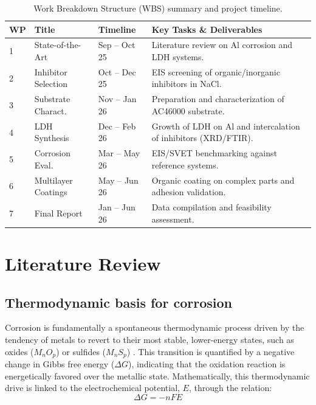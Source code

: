 \documentclass[11pt,twoside,a4paper]{report}
\begin{document}
\begin{table}[htbp]
    \centering
    \small
    \renewcommand{\arraystretch}{1.5} %
    \caption{Work Breakdown Structure (WBS) summary and project timeline.}
    \label{tab:wbs_summary}
    \begin{tabular}{lll>{\raggedright\arraybackslash}p{5cm}}
        \toprule
        WP & Title & Timeline & Key Tasks \& Deliverables \\
        \midrule
        1 & State-of-the-Art & Sep -- Oct 25 & Literature review on Al corrosion and LDH systems. \\
        2 & Inhibitor Selection & Oct -- Dec 25 & EIS screening of organic/inorganic inhibitors in NaCl. \\
        3 & Substrate Charact. & Nov -- Jan 26 & Preparation and characterization of AC46000 substrate. \\
        4 & LDH Synthesis & Dec -- Feb 26 & Growth of LDH on Al and intercalation of inhibitors (XRD/FTIR). \\
        5 & Corrosion Eval. & Mar -- May 26 & EIS/SVET benchmarking against reference systems. \\
        6 & Multilayer Coatings & May -- Jun 26 & Organic coating on complex parts and adhesion validation. \\
        7 & Final Report & Jan -- Jun 26 & Data compilation and feasibility assessment. \\
        \bottomrule
    \end{tabular}
\end{table}


\chapter{Literature Review}
\section{Thermodynamic basis for corrosion}

Corrosion is fundamentally a spontaneous thermodynamic process driven by the tendency of metals to revert to their most stable, lower-energy states, such as oxides ($M_nO_p$) or sulfides ($M_nS_p$) \cite{Sastri2007,Revie2008,Vargel2020}. This transition is quantified by a negative change in Gibbs free energy ($\Delta G$), indicating that the oxidation reaction is energetically favored over the metallic state. Mathematically, this thermodynamic drive is linked to the electrochemical potential, $E$, through the relation:
\begin{equation}
\Delta G = -n F E
\label{gibs}
\end{equation}
\end{document}
